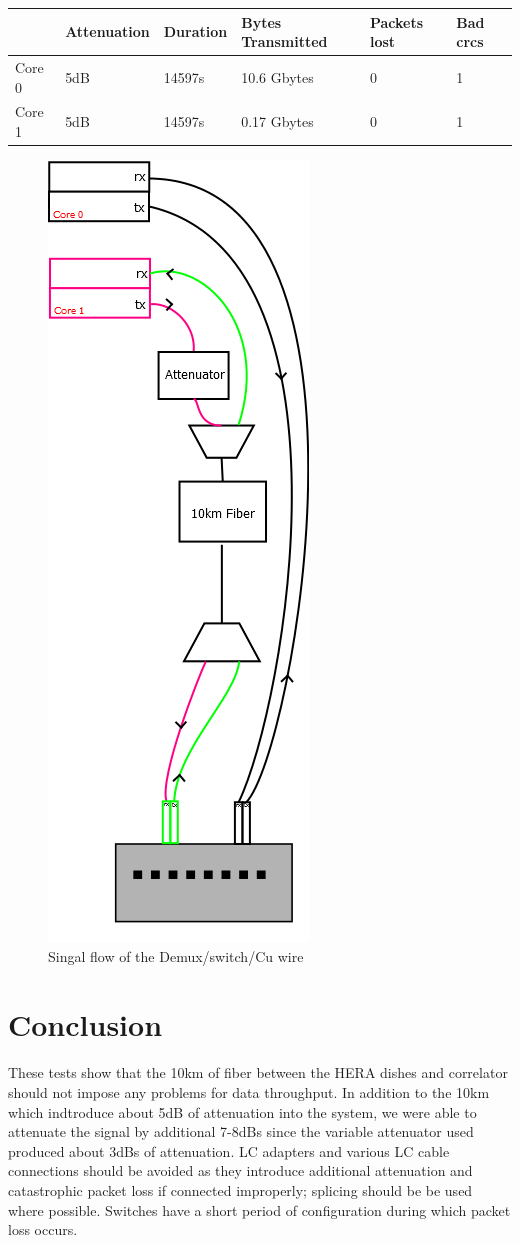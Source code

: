 \documentclass{article}
\begin{document}
\begin{center}
\begin{tabular}{|l|l|l|l|l|p{2cm}|}
	\hline
	& Attenuation & Duration & Bytes Transmitted & Packets lost & Bad crcs \\ \hline
	Core 0 & 5dB & 14597s & 10.6 Gbytes & 0 & 1 \\ \hline
	Core 1 & 5dB & 14597s & 0.17 Gbytes & 0 & 1 \\ \hline
\end{tabular}	
\end{center}


\begin{figure}[h!]
	\centering
	\includegraphics[width = .3\linewidth]{muxswitchcu080415.png}
	\caption{Singal flow of the Demux/switch/Cu wire}
	\label{fig:demuxdiagCu}
\end{figure}

\section*{Conclusion}
These tests show that the 10km of fiber between the HERA dishes and correlator should not impose any problems for data throughput. In addition to the 10km which indtroduce about 5dB of attenuation into the system, we were able to attenuate the signal by additional 7-8dBs since the variable attenuator used produced about 3dBs of attenuation. LC adapters and various LC cable connections should be avoided as they introduce additional attenuation and catastrophic packet loss if connected improperly; splicing should be be used where possible. Switches have a short period of configuration during which packet loss occurs. 
\end{document}
